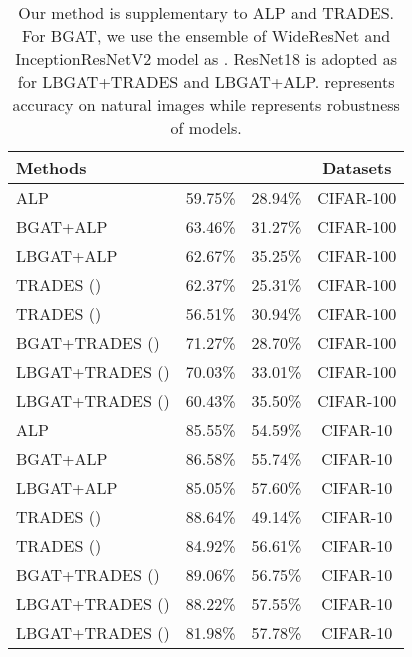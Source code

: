\documentclass[10pt,twocolumn,letterpaper]{article}
\begin{document}
\begin{table}[h]
	\centering
	\caption{Our method is supplementary to ALP and TRADES. For BGAT, we use the ensemble of WideResNet and InceptionResNetV2 model as . ResNet18 is adopted as  for LBGAT+TRADES and LBGAT+ALP.  represents accuracy on natural images while  represents robustness of models.} 
	\resizebox{1.00\linewidth}{!}
	{
	\begin{tabular}{l|c|c|c}
		\textbf{Methods} & & &\textbf{Datasets} \\
		\hline
		\hline
		ALP      & 59.75\% & 28.94\% &CIFAR-100\\
		BGAT+ALP  & 63.46\% & 31.27\% &CIFAR-100\\
		LBGAT+ALP & 62.67\% & 35.25\% &CIFAR-100\\
		TRADES ()      &62.37\% &25.31\% &CIFAR-100 \\
		TRADES ()      &56.51\% &30.94\% &CIFAR-100 \\
		BGAT+TRADES ()  &71.27\% &28.70\% &CIFAR-100 \\
		LBGAT+TRADES () &70.03\% &33.01\% &CIFAR-100 \\
		LBGAT+TRADES () &60.43\% &35.50\% &CIFAR-100 \\
		\hline
		ALP       &85.55\% &54.59\% &CIFAR-10\\
		BGAT+ALP  &86.58\% &55.74\% &CIFAR-10\\
		LBGAT+ALP &85.05\% &57.60\% &CIFAR-10\\
		TRADES () &88.64\% &49.14\% &CIFAR-10 \\
		TRADES ()       &84.92\% &56.61\% &CIFAR-10 \\
		BGAT+TRADES ()  &89.06\% &56.75\% &CIFAR-10 \\
		LBGAT+TRADES () &88.22\% &57.55\% &CIFAR-10 \\
		LBGAT+TRADES () &81.98\% &57.78\% &CIFAR-10 \\
		\hline
	\end{tabular}
    }
	\label{tab:flexibility}
\end{table}
\end{document}
